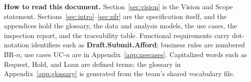 \vspace{1em}
\noindent\textbf{How to read this document.} Section~\ref{sec:vision} is the Vision and Scope statement. Sections~\ref{sec:intro}--\ref{sec:nfr} are the specification itself, and the appendices hold the glossary, the data and analysis models, the use cases, the inspection report, and the traceability table. Functional requirements carry dot-notation identifiers such as \textbf{Draft.Submit.Afford}; business rules are numbered BR-$n$; use cases UC-$n$ are in Appendix~\ref{app:usecases}. Capitalized words such as Request, Hold, and Loan are defined terms; the glossary in Appendix~\ref{app:glossary} is generated from the team's shared vocabulary file.
\clearpage
